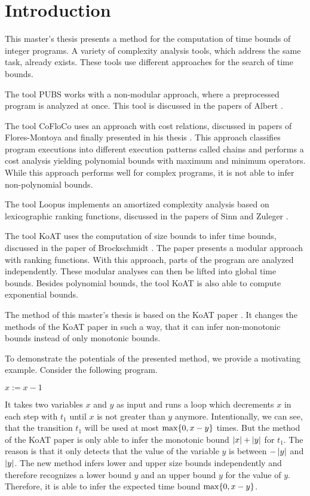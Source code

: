 \section{Introduction}

This master's thesis presents a method for the computation of time bounds of integer programs.
A variety of complexity analysis tools, which address the same task, already exists.
These tools use different approaches for the search of time bounds.

The tool PUBS works with a non-modular approach, where a preprocessed program is analyzed at once.
This tool is discussed in the papers of Albert \cite{pubs1, pubs2}.

The tool CoFloCo uses an approach with cost relations, discussed in papers of Flores-Montoya \cite{cofloco1, cofloco2, cofloco4} and finally presented in his thesis \cite{cofloco3}.
This approach classifies program executions into different execution patterns called chains and performs a cost analysis yielding polynomial bounds with maximum and minimum operators. 
While this approach performs well for complex programs, it is not able to infer non-polynomial bounds.

The tool Loopus implements an amortized complexity analysis based on lexicographic ranking functions, discussed in the papers of Sinn and Zuleger \cite{loopus1, loopus2}.

The tool KoAT uses the computation of size bounds to infer time bounds, discussed in the paper of Brockschmidt \cite{koat}.
The paper presents a modular approach with ranking functions.
With this approach, parts of the program are analyzed independently.
These modular analyses can then be lifted into global time bounds.
Besides polynomial bounds, the tool KoAT \cite{koat} is also able to compute exponential bounds.

The method of this master's thesis is based on the KoAT paper \cite{koat}.
It changes the methods of the KoAT paper \cite{koat} in such a way, that it can infer non-monotonic bounds instead of only monotonic bounds.

To demonstrate the potentials of the presented method, we provide a motivating example.
Consider the following program.

\begin{algorithmic}
    \State $x := x - 1$
  \EndWhile
\end{algorithmic}

It takes two variables $x$ and $y$ as input and runs a loop which decrements $x$ in each step with $t_1$ until $x$ is not greater than $y$ anymore.
Intentionally, we can see, that the transition $t_1$ will be used at most $\max \lbrace 0, x-y \rbrace$ times.
But the method of the KoAT paper \cite{koat} is only able to infer the monotonic bound $\left|x\right|+\left|y\right|$ for $t_1$.
The reason is that it only detects that the value of the variable $y$ is between $-\left|y\right|$ and $\left|y\right|$.
The new method infers lower and upper size bounds independently and therefore recognizes a lower bound $y$ and an upper bound $y$ for the value of $y$.
Therefore, it is able to infer the expected time bound $\max \lbrace 0, x-y \rbrace$.

